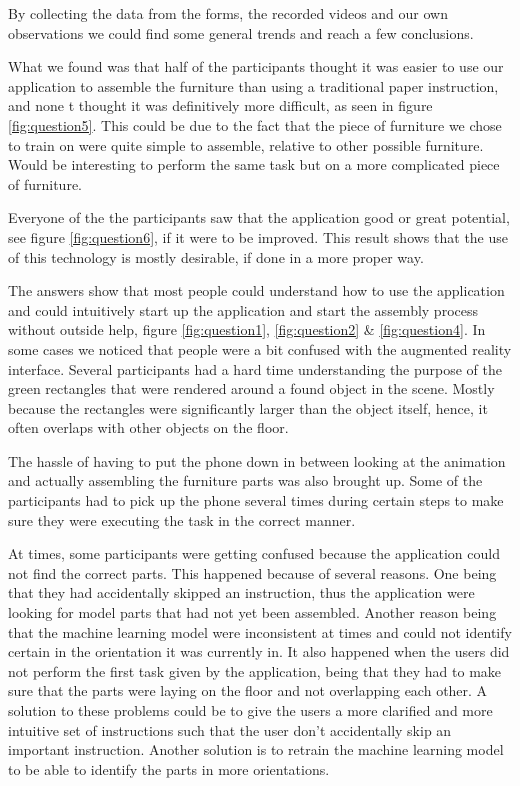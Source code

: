 By collecting the data from the forms, the recorded videos and our own observations we could find some general trends and reach a few conclusions.

What we found was that half of the participants thought it was easier to use our
application to assemble the furniture than using a traditional paper instruction, and none t
thought it was definitively more difficult, as seen in figure \ref{fig:question5}. This could be due to the fact that the piece of furniture we 
chose to train on were quite simple to assemble, relative to other possible furniture. Would be interesting to perform the same task but on a more complicated piece of furniture.

Everyone of the the participants saw that the application good or great potential, see figure \ref{fig:question6}, if it were 
to be improved. This result shows that the use of this technology is mostly desirable, if 
done in a more proper way.

The answers show that most people could understand how to use the application and 
could intuitively start up the application and start the assembly process without outside 
help, figure \ref{fig:question1}, \ref{fig:question2} \& \ref{fig:question4}. In some cases we noticed that people were a bit confused with the augmented reality 
interface. Several participants had a hard time understanding the purpose of the green 
rectangles that were rendered around a found object in the scene. Mostly because the 
rectangles were significantly larger than the object itself, hence, it often overlaps with 
other objects on the floor.

The hassle of having to put the phone down in between looking at the animation and 
actually assembling the furniture parts was also brought up. Some of the participants had 
to pick up the phone several times during certain steps to make sure they were executing 
the task in the correct manner.

At times, some participants were getting confused because the application could not find 
the correct parts. This happened because of several reasons. One being that they had 
accidentally skipped an instruction, thus the application were looking for model parts that 
had not yet been assembled. Another reason being that the machine learning model were 
inconsistent at times and could not identify certain in the orientation it was currently in. It 
also happened when the users did not perform 
the first task given by the application, being that they had to make sure that the parts were 
laying on the floor and not overlapping each other. A solution to these problems could be 
to give the users a more clarified and more intuitive set of instructions such that the user 
don't accidentally skip an important instruction. Another solution is to retrain the machine 
learning model to be able to identify the parts in more orientations. 

